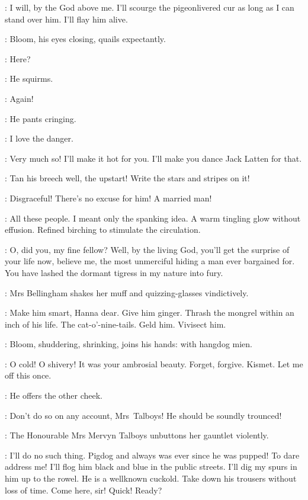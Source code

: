\Talboys:
I will, by the God above me.
I'll scourge the pigeonlivered cur as long as I can stand over him.
I'll flay him alive.

:
Bloom, his eyes closing, quails expectantly.

\Bloom:
Here?

:
He squirms.

\Bloom:
Again!

:
He pants cringing.

\Bloom:
I love the danger.

\Talboys:
Very much so!
I'll make it hot for you.
I'll make you dance Jack Latten for that.

\Bellingham:
Tan his breech well, the upstart!
Write the stars and stripes on it!

\Yelverton:
Disgraceful!
There's no excuse for him!
A married man!

\Bloom:
All these people.
I meant only the spanking idea.
A warm tingling glow without effusion.
Refined birching to stimulate the circulation.

\Talboys:
O, did you, my fine fellow?
Well, by the living God, you'll get the surprise of your life now,
believe me, the most unmerciful hiding a man ever bargained for.
You have lashed the dormant tigress in my nature into fury.

:
Mrs Bellingham shakes her muff and quizzing-glasses vindictively.

\Bellingham:
Make him smart, Hanna dear.
Give him ginger.
Thrash the mongrel within an inch of his life.
The cat-o'-nine-tails.
Geld him.
Vivisect him.

:
Bloom, shuddering, shrinking, joins his hands: with hangdog mien.

\Bloom:
O cold! O shivery!
It was your ambrosial beauty.
Forget, forgive. Kismet.
Let me off this once.

:
He offers the other cheek.

\Yelverton:
Don't do so on any account, Mrs~Talboys!
He should be soundly trounced!

:
The Honourable Mrs Mervyn Talboys unbuttons her gauntlet violently.

\Talboys:
I'll do no such thing.
Pigdog and always was ever since he was pupped!
To dare address me!
I'll flog him black and blue in the public streets.
I'll dig my spurs in him up to the rowel.
He is a wellknown cuckold.
Take down his trousers without loss of time.
Come here, sir! Quick! Ready?

